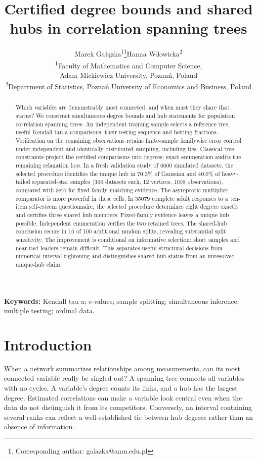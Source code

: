 \documentclass[11pt]{article}
\title{Certified degree bounds and shared hubs in correlation spanning trees}
\author{}\hypersetup{pdfauthor={}}
\author{Marek Ga\l{}\k{a}zka\textsuperscript{1}\thanks{Corresponding author: galazka@amu.edu.pl}\quad Hanna Wdowicka\textsuperscript{2}\\[5pt]
\small\textsuperscript{1}Faculty of Mathematics and Computer Science,\\[-2pt]
\small Adam Mickiewicz University, Pozna\'n, Poland\\[3pt]
\small\textsuperscript{2}Department of Statistics, Pozna\'n University of Economics and Business, Poland}
\date{}
\theoremstyle{plain}
\theoremstyle{definition}\newtheorem{remark}{Remark}\newtheorem{example}{Example}
\begin{document}
\maketitle
\begin{abstract}
Which variables are demonstrably most connected, and when must they share that status? We construct simultaneous degree bounds and hub statements for population correlation spanning trees. An independent training sample selects a reference tree, useful Kendall tau-a comparisons, their testing sequence and betting fractions. Verification on the remaining observations retains finite-sample familywise error control under independent and identically distributed sampling, including ties. Classical tree constraints project the certified comparisons into degrees; exact enumeration audits the remaining relaxation loss. In a fresh validation study of 6600 simulated datasets, the selected procedure identifies the unique hub in 70.3\% of Gaussian and 40.0\% of heavy-tailed separated-star samples (300 datasets each, 12 vertices, 1008 observations), compared with zero for fixed-family matching evidence. The asymptotic multiplier comparator is more powerful in these cells. In 35079 complete adult responses to a ten-item self-esteem questionnaire, the selected procedure determines eight degrees exactly and certifies three shared hub members. Fixed-family evidence leaves a unique hub possible. Independent enumeration verifies the two retained trees. The shared-hub conclusion recurs in 16 of 100 additional random splits, revealing substantial split sensitivity. The improvement is conditional on informative selection: short samples and near-tied leaders remain difficult. This separates useful structural decisions from numerical interval tightening and distinguishes shared hub status from an unresolved unique-hub claim.
\end{abstract}
\noindent\textbf{Keywords:} Kendall tau-a; e-values; sample splitting; simultaneous inference; multiple testing; ordinal data.

\section{Introduction}
When a network summarizes relationships among measurements, can its most connected variable really be singled out? A spanning tree connects all variables with no cycles. A variable's degree counts its links, and a hub has the largest degree. Estimated correlations can make a variable look central even when the data do not distinguish it from its competitors. Conversely, an interval containing several ranks can reflect a well-established tie between hub degrees rather than an absence of information.
\end{document}
